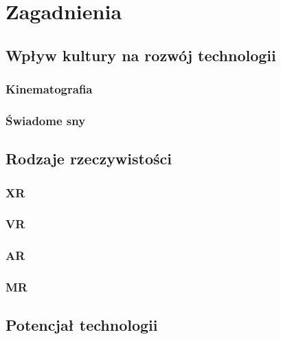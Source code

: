\chapter{Zagadnienia}
\label{ch:zagadnienia}

\section{Wpływ kultury na rozwój technologii}
\label{sec:wplyw}

	\subsection{Kinematografia}
	\label{subsec:kino}

	\subsection{Świadome sny}
	\label{subsec:sny}
	
\section{Rodzaje rzeczywistości}
\label{sec:rodzaje}
	\subsection{XR}
	\label{subsec:xr}
	
	\subsection{VR}
	\label{subsec:vr}

	\subsection{AR}
	\label{subsec:ar}
	
	\subsection{MR}
	\label{subsec:mr}	
			
\section{Potencjał technologii}
\label{sec:potencjal}
